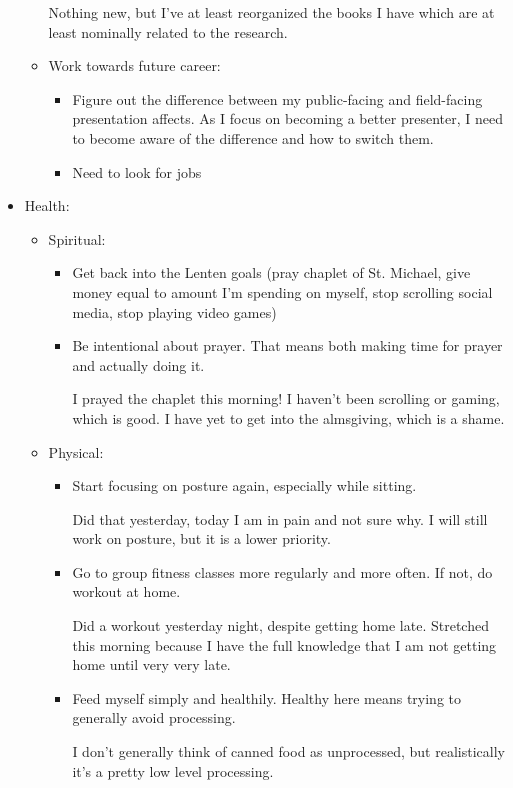 \documentclass[12pt]{article}[titlepage]
\renewcommand{\,}{\textsuperscript{,}}
\begin{document}
\begin{itemize}
\begin{itemize}
Nothing new, but I've at least reorganized the books I have which are at least nominally related to the research.  
\item Work towards future career:   
\begin{itemize}   
\item Figure out the difference between my public-facing and field-facing presentation affects. As I focus on becoming a better presenter, I need to become aware of the difference and how to switch them.  
\item Need to look for jobs  
\end{itemize}   
\end{itemize}   
\item Health:  
\begin{itemize}   
\item Spiritual:   
\begin{itemize}   
\item Get back into the Lenten goals (pray chaplet of St. Michael, give money equal to amount I'm spending on myself, stop scrolling social media, stop playing video games)  
\item Be intentional about prayer. That means both making time for prayer and actually doing it.

I prayed the chaplet this morning!  
I haven't been scrolling or gaming, which is good.  
I have yet to get into the almsgiving, which is a shame.  
\end{itemize}   
\item Physical:   
\begin{itemize}   
\item Start focusing on posture again, especially while sitting.

Did that yesterday, today I am in pain and not sure why. I will still work on posture, but it is a lower priority.  
\item Go to group fitness classes more regularly and more often. If not, do workout at home.

Did a workout yesterday night, despite getting home late.  
Stretched this morning because I have the full knowledge that I am not getting home until very very late.  
\item Feed myself simply and healthily. Healthy here means trying to generally avoid processing.

I don't generally think of canned food as unprocessed, but realistically it's a pretty low level processing.  
\end{itemize}


\end{itemize}
\end{itemize}
\end{document}
